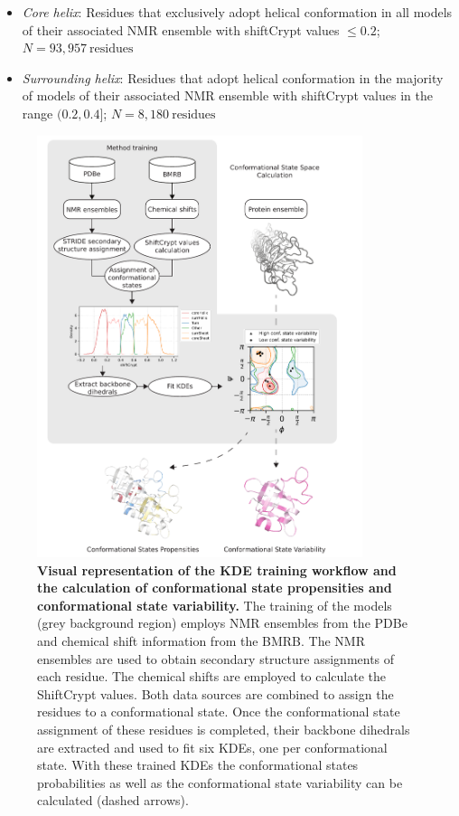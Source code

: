 \begin{itemize} %
  \item \textit{Core helix}: Residues that exclusively adopt helical conformation in all models of their associated NMR ensemble with shiftCrypt values $\le 0.2$; $N = 93,957 \:\text{residues}$
  \item \textit{Surrounding helix}: Residues that adopt helical conformation in the majority of models of their associated NMR ensemble with shiftCrypt values in the range $(0.2, 0.4]$; $N = 8,180 \:\text{residues}$

\end{itemize}




\begin{figure}[H]
    \centering
    \includegraphics[width=0.85\textwidth]{constava/figures_constava/figure1.pdf}
    \caption{\textbf{Visual representation of the KDE training workflow and the calculation of conformational state propensities and conformational state variability.} 
        The training of the models (grey background region) employs NMR ensembles from the PDBe and chemical shift information from the BMRB. The NMR ensembles are used to obtain secondary structure assignments of each residue. The chemical shifts are employed to calculate the ShiftCrypt values. Both data sources are combined to assign the residues to a conformational state. Once the conformational state assignment of these residues is completed, their backbone dihedrals are extracted and used to fit six KDEs, one per conformational state. With these trained KDEs the conformational states probabilities as well as the conformational state variability can be calculated (dashed arrows). }
    \label{overal_figure}
\end{figure}





